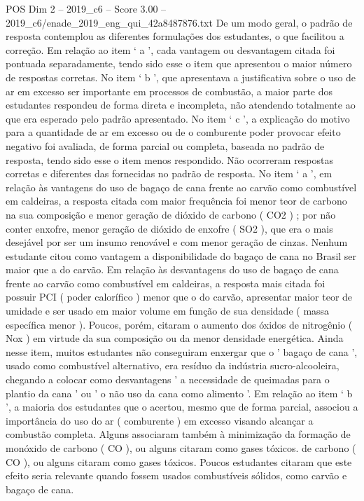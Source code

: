 \begin{textsample}{POS Dim 2 – 2019\_c6 – Score 3.00 – 2019\_c6/enade\_2019\_eng\_qui\_42a8487876.txt}
De um modo geral, o padrão de resposta contemplou as diferentes formulações dos estudantes, o que facilitou a correção.
Em relação ao item ‘ a ’, cada vantagem ou desvantagem citada foi pontuada separadamente, tendo sido esse o item que apresentou o maior número de respostas corretas.
No item ‘ b ’, que apresentava a justificativa sobre o uso de ar em excesso ser importante em processos de combustão, a maior parte dos estudantes respondeu de forma direta e incompleta, não atendendo totalmente ao que era esperado pelo padrão apresentado.
No item ‘ c ’, a explicação do motivo para a quantidade de ar em excesso ou de o comburente poder provocar efeito negativo foi avaliada, de forma parcial ou completa, baseada no padrão de resposta, tendo sido esse o item menos respondido.
Não ocorreram respostas corretas e diferentes das fornecidas no padrão de resposta.
No item ‘ a ’, em relação às vantagens do uso de bagaço de cana frente ao carvão como combustível em caldeiras, a resposta citada com maior frequência foi menor teor de carbono na sua composição e menor geração de dióxido de carbono ( CO2 ) ; por não conter enxofre, menor geração de dióxido de enxofre ( SO2 ), que era o mais desejável por ser um insumo renovável e com menor geração de cinzas.
Nenhum estudante citou como vantagem a disponibilidade do bagaço de cana no Brasil ser maior que a do carvão.
Em relação às desvantagens do uso de bagaço de cana frente ao carvão como combustível em caldeiras, a resposta mais citada foi possuir PCI ( poder calorífico ) menor que o do carvão, apresentar maior teor de umidade e ser usado em maior volume em função de sua densidade ( massa específica menor ).
Poucos, porém, citaram o aumento dos óxidos de nitrogênio ( Nox ) em virtude da sua composição ou da menor densidade energética.
Ainda nesse item, muitos estudantes não conseguiram enxergar que o ' bagaço de cana ', usado como combustível alternativo, era resíduo da indústria sucro-alcooleira, chegando a colocar como desvantagens ' a necessidade de queimadas para o plantio da cana ' ou ' o não uso da cana como alimento '.
Em relação ao item ‘ b ’, a maioria dos estudantes que o acertou, mesmo que de forma parcial, associou a importância do uso do ar ( comburente ) em excesso visando alcançar a combustão completa.
Alguns associaram também à minimização da formação de monóxido de carbono ( CO ), ou alguns citaram como gases tóxicos. de carbono ( CO ), ou alguns citaram como gases tóxicos.
Poucos estudantes citaram que este efeito seria relevante quando fossem usados combustíveis sólidos, como carvão e bagaço de cana.

\end{textsample}
